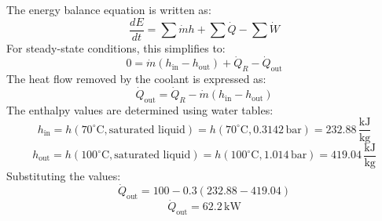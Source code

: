 The energy balance equation is written as:  
\[
\frac{dE}{dt} = \sum \dot{m} h + \sum \dot{Q} - \sum \dot{W}
\]  
For steady-state conditions, this simplifies to:  
\[
0 = \dot{m} (h_{\text{in}} - h_{\text{out}}) + \dot{Q}_R - \dot{Q}_{\text{out}}
\]  
The heat flow removed by the coolant is expressed as:  
\[
\dot{Q}_{\text{out}} = \dot{Q}_R - \dot{m} (h_{\text{in}} - h_{\text{out}})
\]  
The enthalpy values are determined using water tables:  
\[
h_{\text{in}} = h(70^\circ\text{C}, \text{saturated liquid}) = h(70^\circ\text{C}, 0.3142 \, \text{bar}) = 232.88 \, \frac{\text{kJ}}{\text{kg}}
\]  
\[
h_{\text{out}} = h(100^\circ\text{C}, \text{saturated liquid}) = h(100^\circ\text{C}, 1.014 \, \text{bar}) = 419.04 \, \frac{\text{kJ}}{\text{kg}}
\]  
Substituting the values:  
\[
\dot{Q}_{\text{out}} = 100 - 0.3 (232.88 - 419.04)
\]  
\[
\dot{Q}_{\text{out}} = 62.2 \, \text{kW}
\]